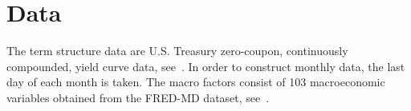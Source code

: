 \section{Data}
The term structure data are U.S. Treasury zero-coupon, continuously compounded, yield curve data, see~\cite{Grkaynak2007}. In order to construct monthly data, the last day of each month is taken. 
The macro factors consist of 103 macroeconomic variables obtained from the FRED-MD dataset, see~\cite{McCracken2016}. 